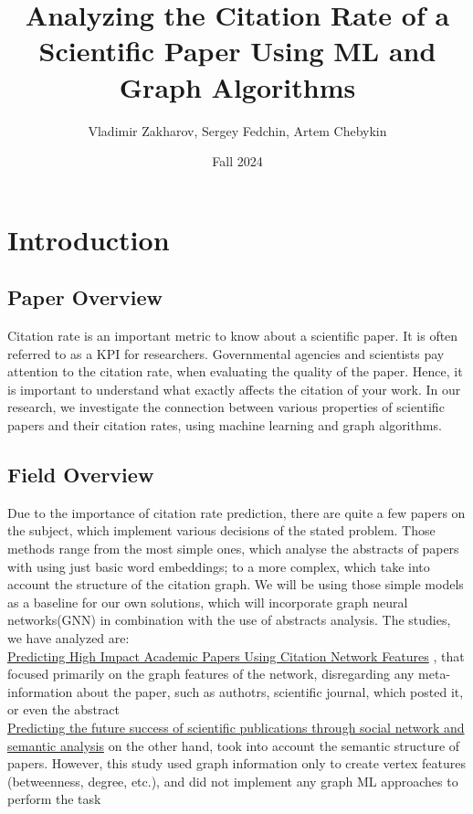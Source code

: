 \documentclass{article}
\title{Analyzing the Citation Rate of a Scientific Paper Using ML and Graph Algorithms}
\author{Vladimir Zakharov, Sergey Fedchin, Artem Chebykin}
\date{Fall 2024}
\newcommand\tab[1][1cm]{\hspace*{#1}}
\begin{document}
\maketitle

\section{Introduction}

\subsection{Paper Overview}

\tab Citation rate is an important metric to know about a scientific paper. It is often referred to as a KPI for researchers. Governmental agencies and scientists pay attention to the citation rate, when evaluating the quality of the paper. Hence, it is important to understand what exactly affects the citation of your work. In our research, we investigate the connection between various properties of scientific papers and their citation rates, using machine learning and graph algorithms. \\

\subsection{Field Overview}
\tab Due to the importance of citation rate prediction, there are quite a few papers on the subject, which implement various decisions of the stated problem. Those methods range from the most simple ones, which analyse the abstracts of papers with using just basic word embeddings; to a more complex, which take into account the structure of the citation graph. We will be using those simple models as a baseline for our own solutions, which will incorporate graph neural networks(GNN) in combination with the use of abstracts analysis. The studies, we have analyzed are: \\

\tab \href{https://link.springer.com/chapter/10.1007/978-3-642-40319-4_2?fromPaywallRec=false}{Predicting High Impact Academic Papers Using Citation Network Features} , that focused primarily on the graph features of the network, disregarding any meta-information about the paper, such as authotrs, scientific journal, which posted it, or even the abstract\\

\tab \href{https://link.springer.com/article/10.1007/s11192-020-03479-5?fromPaywallRec=true}{Predicting the future success of scientific publications through social network and semantic analysis} on the other hand, took into account the semantic structure of papers. However, this study used graph information only to create vertex features (betweenness, degree, etc.), and did not implement any graph ML approaches to perform the task\\
\end{document}
